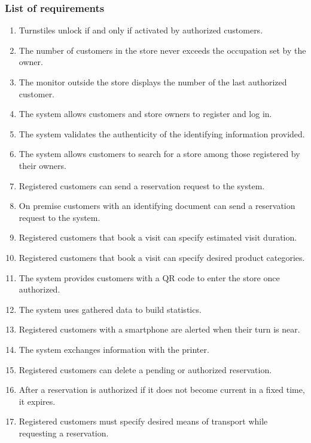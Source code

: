 \subsubsection{List of requirements}
\begin{enumerate}[label=R\arabic*]
	\item Turnstiles unlock if and only if activated by authorized customers.
	\item The number of customers in the store never exceeds the occupation set by the owner.
	\item The monitor outside the store displays the number of the last authorized customer.
	\item The system allows customers and store owners to register and log in.
	\item The system validates the authenticity of the identifying information provided.
	\item The system allows customers to search for a store among those registered by their owners.
	\item Registered customers can send a reservation request to the system.
	\item On premise customers with an identifying document can send a reservation request to the system.
	\item Registered customers that book a visit can specify estimated visit duration.
	\item Registered customers that book a visit can specify desired product categories.
	\item The system provides customers with a QR code to enter the store once authorized.
	\item The system uses gathered data to build statistics. %
	\item Registered customers with a smartphone are alerted when their turn is near.
	\item The system exchanges information with the printer.
	\item Registered customers can delete a pending or authorized reservation.
	\item After a reservation is authorized if it does not become current in a fixed time, it expires.
	\item Registered customers must specify desired means of transport while requesting a reservation.

	
\end{enumerate}
